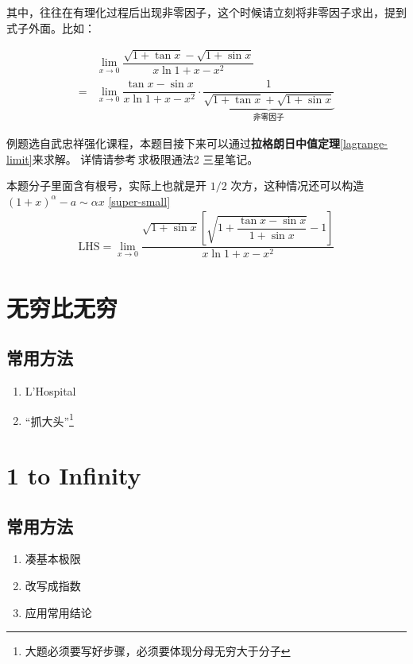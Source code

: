 其中，往往在有理化过程后出现非零因子，这个时候请立刻将非零因子求出，提到式子外面。比如：

\begin{align*}
	&\lim_{x \to 0} \dfrac{\sqrt{1+\tan{x}} - \sqrt{1+\sin{x}}}{x \ln{1+x} - x^2} \\
	=&\lim_{x \to 0} \dfrac{\tan{x} - \sin{x}}{x \ln{1+x} - x^2} \cdot
	\underbrace{\dfrac{1}{\sqrt{1+\tan{x}} + \sqrt{1+\sin{x}}}}_{\mbox{非零因子}}
\end{align*}

例题选自武忠祥强化课程，本题目接下来可以通过\textbf{拉格朗日中值定理}\ref{lagrange-limit}来求解。
详情请参考\,求极限通法2 三星笔记。

本题分子里面含有根号，实际上也就是开 $1/2$ 次方，这种情况还可以构造
$(1+x)^\alpha - a \sim \alpha x$
\ref{super-small}
\begin{equation*}
	\begin{array}{l}
		\mbox{LHS} = \lim_{x \to 0}
		\dfrac{\sqrt{1+\sin{x}}\left[ 
			\sqrt{1+\dfrac{\tan{x}-\sin{x}}{1+\sin{x}}}	- 1
			\right] }{x \ln{1+x} - x^2}
	\end{array}
\end{equation*}

\section{无穷比无穷}

\subsection{常用方法}

\begin{enumerate}
	\item L'Hospital
	\item “抓大头”\footnote{大题必须要写好步骤，必须要体现分母无穷大于分子}
\end{enumerate}

\section{1 to Infinity}
\subsection{常用方法}
\begin{enumerate}
	\item 凑基本极限
	\item 改写成指数
	\item 应用常用结论
\end{enumerate}

